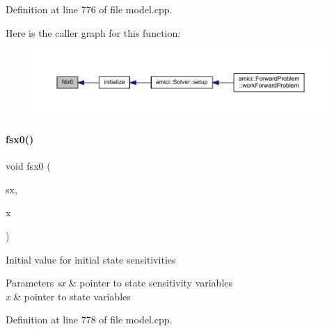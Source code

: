 Definition at line 776 of file model.\+cpp.

Here is the caller graph for this function\+:
\nopagebreak
\begin{figure}[H]
\begin{center}
\leavevmode
\includegraphics[width=350pt]{classamici_1_1_model_a8c3a1647a75581d9e2fc5de106d87a0d_icgraph}
\end{center}
\end{figure}
\mbox{\label{classamici_1_1_model_a6f46a63f0524ad25e4125254b78fdee9}} 
\paragraph{\texorpdfstring{fsx0()}{fsx0()}\hspace{0.1cm}{\footnotesize\ttfamily [1/2]}}
{\footnotesize\ttfamily void fsx0 (\begin{DoxyParamCaption}\item[{\mbox{\hyperlink{classamici_1_1_ami_vector_array}{Ami\+Vector\+Array}} $\ast$}]{sx,  }\item[{const \mbox{\hyperlink{classamici_1_1_ami_vector}{Ami\+Vector}} $\ast$}]{x }\end{DoxyParamCaption})}

Initial value for initial state sensitivities 
\begin{DoxyParams}{Parameters}
{\em sx} & pointer to state sensitivity variables \\
\hline
{\em x} & pointer to state variables \\
\hline
\end{DoxyParams}


Definition at line 778 of file model.\+cpp.

